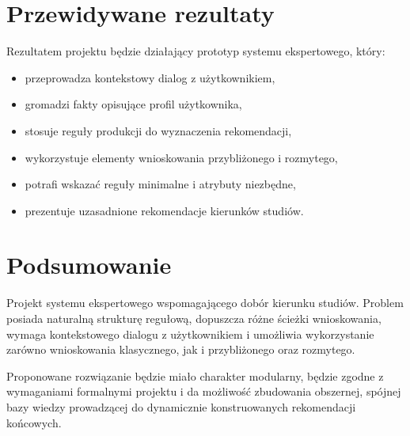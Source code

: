 \documentclass[12pt,a4paper,oneside]{article}
\begin{document}
\section{Przewidywane rezultaty}

Rezultatem projektu będzie działający prototyp systemu ekspertowego, który:
\begin{itemize}[leftmargin=1.2cm]
    \item przeprowadza kontekstowy dialog z użytkownikiem,
    \item gromadzi fakty opisujące profil użytkownika,
    \item stosuje reguły produkcji do wyznaczenia rekomendacji,
    \item wykorzystuje elementy wnioskowania przybliżonego i rozmytego,
    \item potrafi wskazać reguły minimalne i atrybuty niezbędne,
    \item prezentuje uzasadnione rekomendacje kierunków studiów.
\end{itemize}

\section{Podsumowanie}

Projekt systemu ekspertowego wspomagającego dobór kierunku studiów. Problem posiada naturalną strukturę regułową, dopuszcza różne ścieżki wnioskowania, wymaga kontekstowego dialogu z użytkownikiem i umożliwia wykorzystanie zarówno wnioskowania klasycznego, jak i przybliżonego oraz rozmytego.

Proponowane rozwiązanie będzie miało charakter modularny, będzie zgodne z wymaganiami formalnymi projektu i da możliwość zbudowania obszernej, spójnej bazy wiedzy prowadzącej do dynamicznie konstruowanych rekomendacji końcowych.

\end{document}
